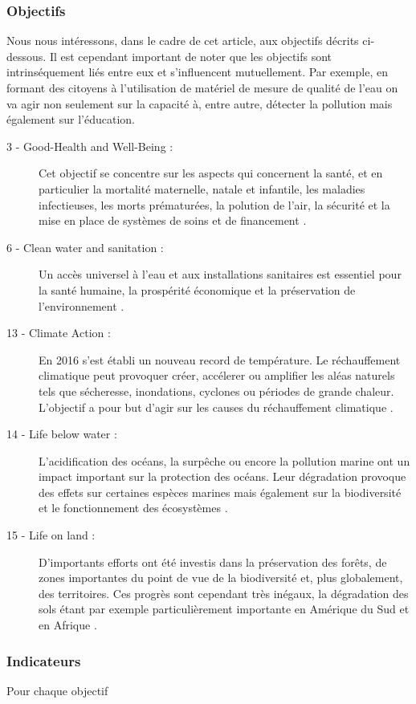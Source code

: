 \documentclass[10pt, conference, compsocconf]{llncs}
\begin{document}
		\subsubsection{Objectifs}
		Nous nous intéressons, dans le cadre de cet article, aux objectifs décrits ci-dessous. Il est cependant important de noter que les objectifs sont intrinséquement liés entre eux et s'influencent mutuellement. Par exemple, en formant des citoyens à l'utilisation de matériel de mesure de qualité de l'eau on va agir non seulement sur la capacité à, entre autre, détecter la pollution mais également sur l'éducation.
		\begin{description}
			\item[ 3 - Good-Health and Well-Being :] Cet objectif se concentre sur les aspects qui	concernent la santé, et en particulier la mortalité maternelle, natale et infantile, les maladies infectieuses, les morts prématurées, la polution de l'air, la sécurité et la mise en place de systèmes de soins et de financement \cite{sdkp_goal_nodate-5}.
			\item[ 6 - Clean water and sanitation :] Un accès universel à l'eau et aux installations sanitaires est essentiel pour la santé humaine, la prospérité économique et la préservation de l'environnement \cite{sdkp_goal_nodate-4}.
			\item[13 - Climate Action :] En 2016 s'est établi un nouveau record de température. Le réchauffement climatique peut provoquer créer, accélerer ou amplifier les aléas	naturels tels que sécheresse, inondations, cyclones ou périodes de grande chaleur. L'objectif a pour but d'agir sur les causes du réchauffement climatique \cite{sdkp_goal_nodate}.
			\item[14 - Life below water :] L'acidification des océans, la surpêche ou encore la pollution marine ont un impact important sur la protection des océans. Leur dégradation provoque des effets sur certaines espèces marines mais également sur la biodiversité et le fonctionnement des écosystèmes \cite{sdkp_goal_nodate-2}.
			\item[15 - Life on land :] D'importants efforts ont été investis dans la préservation des forêts, de zones importantes du point de vue de la biodiversité et, plus globalement, des territoires. Ces progrès sont cependant très inégaux, la dégradation des sols étant par exemple particulièrement importante en Amérique du Sud et en Afrique \cite{sdkp_goal_nodate-3}.
		\end{description}
		
		\subsubsection{Indicateurs}
		Pour chaque objectif
\end{document}
